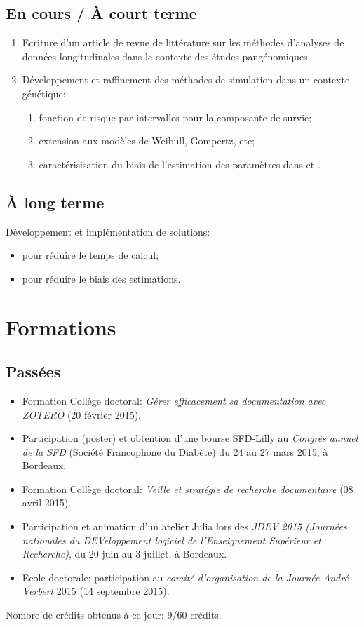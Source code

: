 \documentclass[11pt, a4paper]{article}
\begin{document}
\subsection{En cours / À court terme}
\par{
\begin{enumerate}
    \item Ecriture d’un article de revue de littérature sur les méthodes d’analyses de données longitudinales dans le contexte des études pangénomiques.
    \item Développement et raffinement des méthodes de simulation dans un contexte génétique:
    \begin{enumerate}
        \item fonction de risque par intervalles pour la composante de survie;
        \item extension aux modèles de Weibull, Gompertz, etc;
        \item caractérisisation du biais de l’estimation des paramètres dans  et .
    \end{enumerate}
\end{enumerate}
\subsection{À long terme}
Développement et implémentation de solutions:
\begin{itemize}
    \item pour réduire le temps de calcul;
    \item pour réduire le biais des estimations.
\end{itemize}
}


\clearpage
\section{Formations}
\subsection{Passées}
\par{
\begin{itemize}
    \item Formation Collège doctoral: \textit{Gérer efficacement sa documentation avec ZOTERO} (20 février 2015).
    \item Participation (poster) et obtention d’une bourse SFD-Lilly au \textit{Congrès annuel de la SFD} (Société Francophone du Diabète) du 24 au 27 mars 2015,
    à Bordeaux.
    \item Formation Collège doctoral: \textit{Veille et stratégie de recherche documentaire} (08 avril 2015).
    \item Participation et animation d’un atelier Julia lors des \textit{JDEV 2015
    (Journées nationales du DEVeloppement logiciel de l'Enseignement Supérieur et Recherche)},
    du 20 juin au 3 juillet, à Bordeaux.
    \item Ecole doctorale: participation au \textit{comité d'organisation de la Journée André Verbert} 2015 (14 septembre 2015).
\end{itemize}
Nombre de crédits obtenus à ce jour: 9/60 crédits.
}
\end{document}
